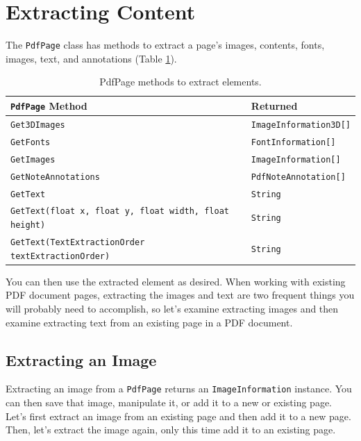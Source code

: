 \documentclass[american,letterpaper]{tufte-book}
\providecommand{\tabularnewline}{\\}
\numberwithin{equation}{section}
\numberwithin{figure}{section}
\begin{document}
{{\section{Extracting Content}

The \texttt{PdfPage} class has methods to extract a page's images,
contents, fonts, images, text, and annotations (Table \ref{tab:PdfPage-methods-to}).

\begin{table}
\begin{tabular}{>{\raggedright}p{}>{\raggedright}p{}}
\toprule 
{\footnotesize\texttt{PdfPage}}{\footnotesize{} Method} & {\footnotesize Returned}\tabularnewline
\midrule
{\footnotesize\texttt{Get3DImages}} & {\footnotesize\texttt{ImageInformation3D{[}{]}}}\tabularnewline
{\footnotesize\texttt{GetFonts}} & {\footnotesize\texttt{FontInformation{[}{]}}}\tabularnewline
{\footnotesize\texttt{GetImages}} & {\footnotesize\texttt{ImageInformation{[}{]}}}\tabularnewline
{\footnotesize\texttt{GetNoteAnnotations}} & {\footnotesize\texttt{PdfNoteAnnotation{[}{]}}}\tabularnewline
{\footnotesize\texttt{GetText}} & {\footnotesize\texttt{String}}\tabularnewline
{\footnotesize\texttt{GetText(float x, float y, float width, float
height)}} & {\footnotesize\texttt{String}}\tabularnewline
{\footnotesize\texttt{GetText(TextExtractionOrder textExtractionOrder)}} & {\footnotesize\texttt{String}}\tabularnewline
\bottomrule
\end{tabular}\caption{PdfPage methods to extract elements.}\label{tab:PdfPage-methods-to}
\end{table}

\medskip{}
You can then use the extracted element as desired. When working with
existing PDF document pages, extracting the images and text are two
frequent things you will probably need to accomplish, so let's examine
extracting images and then examine extracting text from an existing
page in a PDF document. 

\subsection{Extracting an Image}

Extracting an image from a \texttt{PdfPage} returns an \texttt{ImageInformation} instance. You can then save that image, manipulate
it, or add it to a new or existing page. Let's first extract an image
from an existing page and then add it to a new page. Then, let's extract
the image again, only this time add it to an existing page.

}}
\end{document}
